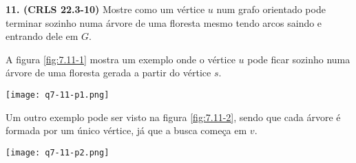 

\noindent\textbf{11. (CRLS 22.3-10)} Mostre como um vértice $u$ num grafo orientado pode terminar sozinho numa árvore de uma floresta  mesmo tendo arcos saindo e entrando dele em $G$.

A figura \ref{fig:7.11-1} mostra um exemplo onde o vértice $u$ pode ficar sozinho numa árvore de uma floresta  gerada a partir do vértice $s$.
\begin{center}
\texttt{[image: q7-11-p1.png]}
\label{fig:7.11-1}
\end{center}


Um outro exemplo pode ser visto na figura \ref{fig:7.11-2}, sendo que cada árvore é formada por um único vértice, já que a busca começa em $v$.
\begin{center}
\texttt{[image: q7-11-p2.png]}
\label{fig:7.11-2}
\end{center}